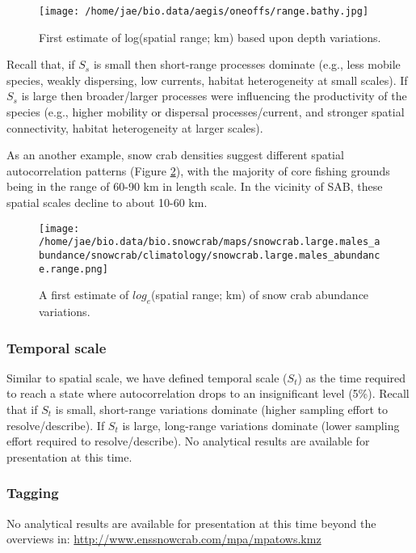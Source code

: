 \documentclass[letterpaper,portrait,11pt]{scrartcl}
\numberwithin{equation}{section}    %
\numberwithin{figure}{section}    %
\numberwithin{table}{section}       %
\begin{document}
\begin{figure}[ht]
  \centering
  \texttt{[image: /home/jae/bio.data/aegis/oneoffs/range.bathy.jpg]}
  \caption{First estimate of log(spatial range; km) based upon depth variations.}
    \label{fig:spatialrangeBathy}
\end{figure}

Recall that, if $S_s$ is small then short-range processes dominate (e.g., less mobile species, weakly dispersing, low currents, habitat heterogeneity at small scales).  If $S_s$ is large then broader/larger processes were influencing the productivity of the species (e.g., higher mobility or dispersal processes/current, and stronger spatial connectivity, habitat heterogeneity at larger scales).

As an another example, snow crab densities suggest different spatial autocorrelation patterns (Figure \ref{fig:spatialrangeSnowcrab}), with the majority of core fishing grounds being in the range of 60-90 km in length scale. In the vicinity of SAB, these spatial scales decline to about 10-60 km.

\begin{figure}[h]
  \centering
  \texttt{[image: /home/jae/bio.data/bio.snowcrab/maps/snowcrab.large.males\_abundance/snowcrab/climatology/snowcrab.large.males\_abundance.range.png]}
  \caption{A first estimate of $log_e$(spatial range; km) of snow crab abundance variations.}
  \label{fig:spatialrangeSnowcrab}
\end{figure}


\subsubsection{Temporal scale}

Similar to spatial scale, we have defined temporal scale ($S_t$) as the time required to reach a state where autocorrelation drops to an insignificant level (5\%). Recall that if $S_t$ is small, short-range variations dominate (higher sampling effort to resolve/describe). If $S_t$ is large, long-range variations dominate (lower sampling effort required to resolve/describe). No analytical results are available for presentation at this time.



\subsubsection{Tagging}

No analytical results are available for presentation at this time beyond the overviews in: \url{http://www.enssnowcrab.com/mpa/mpatows.kmz}
\end{document}
